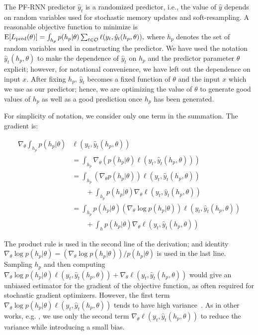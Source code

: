 \documentclass[letterpaper]{article} %
\begin{document}
The PF-RNN predictor $\hat{y}_t$ is a randomized predictor, i.e.,
the value of $\hat{y}$ depends on random variables used for stochastic memory updates and soft-resampling. 
A reasonable objective function to minimize is $\mathrm{E}[L_\mathrm{pred}(\theta)] = \int_{h_p} p(h_p|\theta)\sum_{t\in \cal{O}}\ell(y_t,\hat{y}_t(h_p,\theta)),$ where $h_p$ denotes the set of random variables used in constructing the predictor. We have used the notation $\hat{y}_t(h_p,\theta)$ to make the dependence of $\hat{y}_t$ on $h_p$ and the predictor parameter $\theta$ explicit; however, for notational convenience, we have left out the dependence on input $x$. After fixing $h_p$, $\hat{y}_t$ becomes a fixed function of $\theta$ and the input $x$ which we use as our predictor; hence, we are optimizing the value of $\theta$ to generate good values of $h_p$ as well as a good prediction once $h_p$ has been generated.  

For simplicity of notation, we consider only one term in the summation. The gradient is:

\begin{align*}
\nabla_\theta \int_{h_p} p(h_p|\theta)& \ell(y_t,\hat{y}_t(h_p, \theta)) \\
&= \int_{h_p} \nabla_\theta (p(h_p|\theta) \ell(y_t,\hat{y}_t(h_p, \theta)))\\
&= \int_{h_p} (\nabla_\theta p(h_p|\theta)) \ell(y_t,\hat{y}_t(h_p, \theta)) \\
&\qquad+ \int_{h_p} p(h_p|\theta) \nabla_\theta \ell(y_t,\hat{y}_t(h_p, \theta)) \\
&= \int_{h_p} p(h_p|\theta) (\nabla_\theta \log p(h_p|\theta)) \ell(y_t,\hat{y}_t(h_p, \theta)) \\
&\qquad + \int_h p(h_p|\theta) \nabla_\theta \ell(y_t,\hat{y}_t(h_p, \theta))  
\end{align*}

The product rule is used in the second line of the derivation; and identity $\nabla_\theta \log p(h_p|\theta) = (\nabla_\theta \log p(h_p|\theta))/p(h_p|\theta) $ is used in the last line. Sampling $h_p$ and then computing $\nabla_\theta \log p(h_p|\theta) \ell(y_t,\hat{y}_t(h_p, \theta)) + \nabla_\theta \ell(y_t,\hat{y}_t(h_p, \theta))$ would give an unbiased estimator for the gradient of the objective function, as often required for stochastic gradient optimizers. However, the first term $\nabla_\theta \log p(h_p|\theta) \ell(y_t,\hat{y}_t(h_p, \theta))$ tends to have high variance~\cite{le2017auto}. As in other works, e.g. \cite{le2017auto}, we use only the second term $\nabla_\theta \ell(y_t,\hat{y}_t(h_p, \theta))$ to reduce the variance while introducing a small bias. 
\end{document}
